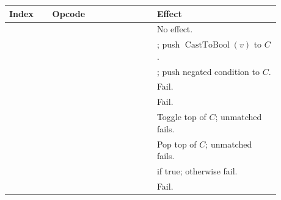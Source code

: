 \begin{longtable}{@{}L{0.14\linewidth}L{0.34\linewidth}L{0.40\linewidth}@{}}
\toprule
Index & Opcode & Effect \\
\midrule
{} &  & No effect. \\
 &  & ; push \(\operatorname{CastToBool}(v)\) to \(C\). \\
 &  & ; push negated condition to \(C\). \\
 &  & Fail. \\
 &  & Fail. \\
 &  & Toggle top of \(C\); unmatched  fails. \\
 &  & Pop top of \(C\); unmatched  fails. \\
 &  &  if true; otherwise fail. \\
 &  & Fail. \\
\bottomrule
\end{longtable}


